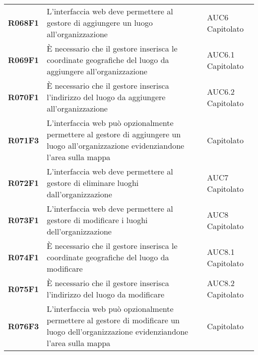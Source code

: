 \documentclass[../analisi-dei-requisiti.tex]{subfiles}
\begin{document}
\begin{longtable}[H]{>{\centering\bfseries}m{3cm} >{\centering}m{10cm} >{\centering\arraybackslash}m{3cm}}
  R068F1                               & L'interfaccia web deve permettere al gestore di aggiungere un luogo all'organizzazione                                                                                                                  & AUC6 Capitolato               \\
  R069F1                               & È necessario che il gestore inserisca le coordinate geografiche del luogo da aggiungere all'organizzazione                                                                                              & AUC6.1 Capitolato             \\
  R070F1                               & È necessario che il gestore inserisca l'indirizzo del luogo da aggiungere all'organizzazione                                                                                                            & AUC6.2 Capitolato             \\
  R071F3                               & L'interfaccia web può opzionalmente permettere al gestore di aggiungere un luogo all'organizzazione evidenziandone l'area sulla mappa                                                                   & Capitolato                    \\
  R072F1                               & L'interfaccia web deve permettere al gestore di eliminare luoghi dall'organizzazione                                                                                                                    & AUC7 Capitolato               \\
  R073F1                               & L'interfaccia web deve permettere al gestore di modificare i luoghi dell'organizzazione                                                                                                                 & AUC8 Capitolato               \\
  R074F1                               & È necessario che il gestore inserisca le coordinate geografiche del luogo da modificare                                                                                                                 & AUC8.1 Capitolato             \\
  R075F1                               & È necessario che il gestore inserisca l'indirizzo del luogo da modificare                                                                                                                               & AUC8.2 Capitolato             \\
  R076F3                               & L'interfaccia web può opzionalmente permettere al gestore di modificare un luogo dell'organizzazione evidenziandone l'area sulla mappa                                                                  & Capitolato                    \\

\end{longtable}
\end{document}
